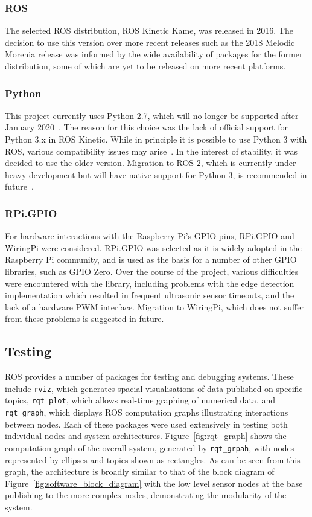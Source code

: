 \subsubsection{ROS}
The selected ROS distribution, ROS Kinetic Kame, was released in 2016. The
decision to use this version over more recent releases such as the 2018
Melodic Morenia release was informed by the wide availability of packages
for the former distribution, some of which are yet to be released on more
recent platforms.

\subsubsection{Python}
This project currently uses Python 2.7, which will no longer be supported
after January 2020~\cite{python2-eol}. The reason for this choice was the
lack of official support for Python 3.x in ROS Kinetic. While in principle
it is possible to use Python 3 with ROS, various compatibility issues may
arise~\cite{medium-ros-python3}. In the interest of stability,
it was decided to use the older version. Migration to ROS 2, which is
currently under heavy development but will have native support for Python
3, is recommended in future~\cite{ros2}.

\subsubsection{RPi.GPIO}
For hardware interactions with the Raspberry Pi's GPIO pins, RPi.GPIO and
WiringPi were considered. RPi.GPIO was selected as it is widely adopted in
the Raspberry Pi community, and is used as the basis for a number of other
GPIO libraries, such as GPIO Zero. Over the course of the project, various difficulties were encountered with
the library, including problems with the edge detection implementation which
resulted in frequent ultrasonic sensor timeouts, and the lack of a hardware
PWM interface. Migration to WiringPi, which does not suffer from these problems
is suggested in future.


\subsection{Testing}\label{soft/ROS/test}
ROS provides a number of packages for testing and debugging systems. These
include \verb|rviz|, which generates spacial visualisations of data published
on specific topics, \verb|rqt_plot|, which allows real-time graphing of
numerical data, and \verb|rqt_graph|, which displays ROS computation graphs
illustrating interactions between nodes. Each of these packages were used
extensively in testing both individual nodes and system architectures.
Figure~\ref{fig:rqt_graph} shows the computation graph of the overall system,
generated by \verb|rqt_grpah|, with nodes represented by ellipses and topics
shown as rectangles. As can be seen from this graph, the architecture is broadly similar to that of the block diagram of Figure~\ref{fig:software_block_diagram} with the low level sensor nodes at the base publishing to the more complex nodes, demonstrating the modularity of the system.

